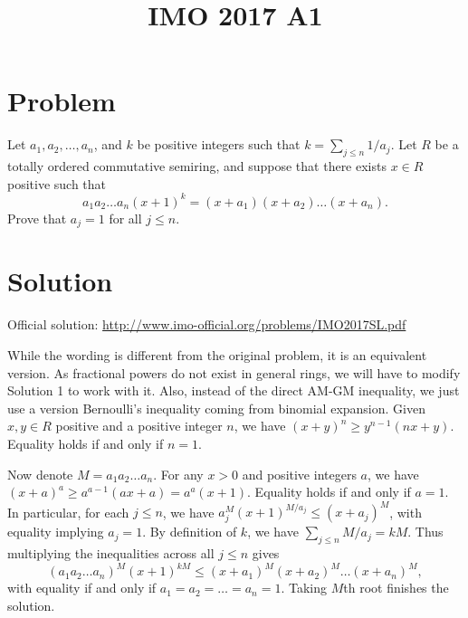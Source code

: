 \documentclass{article}
\title{IMO 2017 A1}
\author{}
\date{}
\begin{document}
\maketitle



\section*{Problem}

Let $a_1, a_2, \ldots, a_n$, and $k$ be positive integers such that $k = \sum_{j \leq n} 1/a_j$.
Let $R$ be a totally ordered commutative semiring, and suppose that there exists $x \in R$ positive such that
\[ a_1 a_2 \ldots a_n (x + 1)^k = (x + a_1) (x + a_2) \ldots (x + a_n). \]
Prove that $a_j = 1$ for all $j \leq n$.



\section*{Solution}

Official solution: \url{http://www.imo-official.org/problems/IMO2017SL.pdf}

While the wording is different from the original problem, it is an equivalent version.
As fractional powers do not exist in general rings, we will have to modify Solution 1 to work with it.
Also, instead of the direct AM-GM inequality, we just use a version Bernoulli's inequality coming from binomial expansion.
Given $x, y \in R$ positive and a positive integer $n$, we have $(x + y)^n \geq y^{n - 1} (nx + y)$.
Equality holds if and only if $n = 1$.

Now denote $M = a_1 a_2 \ldots a_n$.
For any $x > 0$ and positive integers $a$, we have $(x + a)^a \geq a^{a - 1} (ax + a) = a^a (x + 1)$.
Equality holds if and only if $a = 1$.
In particular, for each $j \leq n$, we have $a_j^M (x + 1)^{M/a_j} \leq (x + a_j)^M$, with equality implying $a_j = 1$.
By definition of $k$, we have $\sum_{j \leq n} M/a_j = kM$.
Thus multiplying the inequalities across all $j \leq n$ gives
\[ (a_1 a_2 \ldots a_n)^M (x + 1)^{kM} \leq (x + a_1)^M (x + a_2)^M \ldots (x + a_n)^M, \]
    with equality if and only if $a_1 = a_2 = \ldots = a_n = 1$.
Taking $M$th root finishes the solution.
\end{document}
